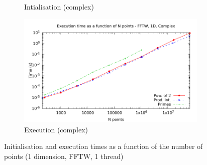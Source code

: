 \documentclass[12pt, a4paper]{article}
\begin{document}
\begin{figure}[H]
\begin{subfigure}{.5\textwidth}
\caption{Intialisation (complex)}
\label{1DFFTWCI}
\end{subfigure}%
\begin{subfigure}{.5\textwidth}
\centering
\includegraphics[width=.9\linewidth]{graphs/1d-fftw-exec-c.pdf}
\caption{Execution (complex)}
\label{1DFFTWC}
\end{subfigure}
\caption{Initialisation and execution times as a function of the number of points (1 dimension, FFTW, 1 thread)}
\label{1DFFTW}
\end{figure}
\end{document}
